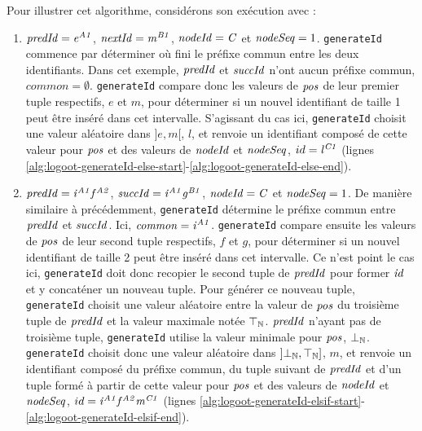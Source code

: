 Pour illustrer cet algorithme, considérons son exécution avec :
\begin{enumerate}
  \item $\mathit{predId} = \mathit{e}^{\mathit{A1}}_{\mathit{}}$, $\mathit{nextId} = \mathit{m}^{\mathit{B1}}_{\mathit{}}$, $\mathit{nodeId} = \mathit{C}$ et $\mathit{nodeSeq} = 1$.
    \texttt{generateId} commence par déterminer où fini le préfixe commun entre les deux identifiants.
    Dans cet exemple, $\mathit{predId}$ et $\mathit{succId}$ n'ont aucun préfixe commun, \ie $common = \emptyset$.
    \texttt{generateId} compare donc les valeurs de $\mathit{pos}$ de leur premier tuple respectifs, \ie $e$ et $m$, pour déterminer si un nouvel identifiant de taille 1 peut être inséré dans cet intervalle.
    S'agissant du cas ici, \texttt{generateId} choisit une valeur aléatoire dans $]e,m[$, \eg $l$, et renvoie un identifiant composé de cette valeur pour $\mathit{pos}$ et des valeurs de $\mathit{nodeId}$ et $\mathit{nodeSeq}$, \ie $id = \mathit{l}^{\mathit{C1}}_{\mathit{}}$ (lignes \ref{alg:logoot-generateId-else-start}-\ref{alg:logoot-generateId-else-end}).
  \item $\mathit{predId} = \mathit{i}^{\mathit{A1}}_{\mathit{}}\mathit{f}^{\mathit{A2}}_{\mathit{}}$, $\mathit{succId} = \mathit{i}^{\mathit{A1}}_{\mathit{}}\mathit{g}^{\mathit{B1}}_{\mathit{}}$, $\mathit{nodeId} = \mathit{C}$ et $\mathit{nodeSeq} = 1$.
    De manière similaire à précédemment, \texttt{generateId} détermine le préfixe commun entre $\mathit{predId}$ et $\mathit{succId}$.
    Ici, $\mathit{common} = \mathit{i}^{\mathit{A1}}_{\mathit{}}$.
    \texttt{generateId} compare ensuite les valeurs de $\mathit{pos}$ de leur second tuple respectifs, \ie $f$ et $g$, pour déterminer si un nouvel identifiant de taille 2 peut être inséré dans cet intervalle.
    Ce n'est point le cas ici, \texttt{generateId} doit donc recopier le second tuple de $\mathit{predId}$ pour former $\mathit{id}$ et y concaténer un nouveau tuple.
    Pour générer ce nouveau tuple, \texttt{generateId} choisit une valeur aléatoire entre la valeur de $\mathit{pos}$ du troisième tuple de $\mathit{predId}$ et la valeur maximale notée $\top_\mathbb{N}$.
    $\mathit{predId}$ n'ayant pas de troisième tuple, \texttt{generateId} utilise la valeur minimale pour $\mathit{pos}$, $\bot_\mathbb{N}$.
    \texttt{generateId} choisit donc une valeur aléatoire dans $]\bot_\mathbb{N},\top_\mathbb{N}]$\footnotemark, \eg $m$, et renvoie un identifiant composé du préfixe commun, du tuple suivant de $\mathit{predId}$ et d'un tuple formé à partir de cette valeur pour $\mathit{pos}$ et des valeurs de $\mathit{nodeId}$ et $\mathit{nodeSeq}$, \ie $id = \mathit{i}^{\mathit{A1}}_{\mathit{}}\mathit{f}^{\mathit{A2}}_{\mathit{}}\mathit{m}^{\mathit{C1}}_{\mathit{}}$ (lignes \ref{alg:logoot-generateId-elsif-start}-\ref{alg:logoot-generateId-elsif-end}).
\end{enumerate}


